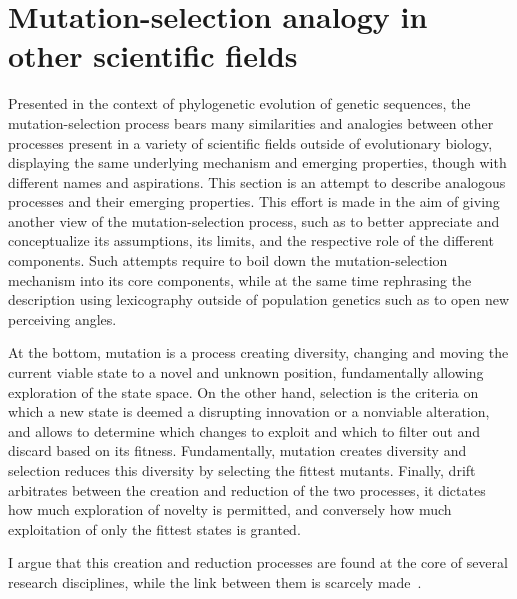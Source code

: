 \section{Mutation-selection analogy in other scientific fields}

Presented in the context of phylogenetic evolution of genetic sequences, the mutation-selection process bears many similarities and analogies between other processes present in a variety of scientific fields outside of evolutionary biology, displaying the same underlying mechanism and emerging properties, though with different names and aspirations.
This section is an attempt to describe analogous processes and their emerging properties.
This effort is made in the aim of giving another view of the mutation-selection process, such as to better appreciate and conceptualize its assumptions, its limits, and the respective role of the different components.
Such attempts require to boil down the mutation-selection mechanism into its core components, while at the same time rephrasing the description using lexicography outside of population genetics such as to open new perceiving angles.

At the bottom, mutation is a process creating diversity, changing and moving the current viable state to a novel and unknown position, fundamentally allowing exploration of the state space.
On the other hand, selection is the criteria on which a new state is deemed a disrupting innovation or a nonviable alteration, and allows to determine which changes to exploit and which to filter out and discard based on its fitness.
Fundamentally, mutation creates diversity and selection reduces this diversity by selecting the fittest mutants.
Finally, drift arbitrates between the creation and reduction of the two processes, it dictates how much exploration of novelty is permitted, and conversely how much exploitation of only the fittest states is granted.

I argue that this creation and reduction processes are found at the core of several research disciplines, while the link between them is scarcely made~\citep{Baeck1994, Eiben1998}.

